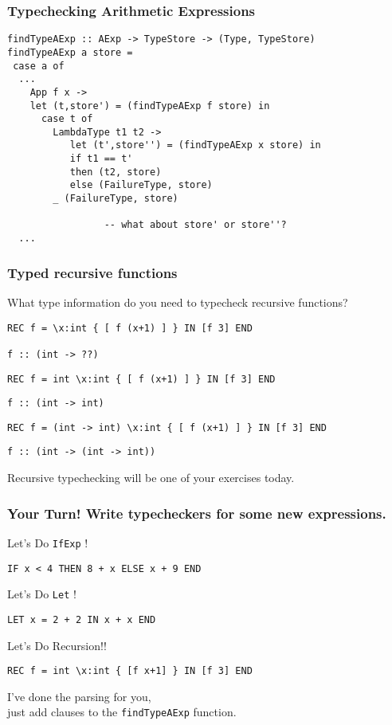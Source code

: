 \documentclass{beamer}
\begin{document}
\begin{frame}[fragile]
\frametitle{Typechecking Arithmetic Expressions}
\begin{verbatim}
findTypeAExp :: AExp -> TypeStore -> (Type, TypeStore)
findTypeAExp a store =
 case a of
  ...
    App f x -> 
    let (t,store') = (findTypeAExp f store) in
      case t of
        LambdaType t1 t2 -> 
           let (t',store'') = (findTypeAExp x store) in
           if t1 == t'
           then (t2, store)
           else (FailureType, store)
        _ (FailureType, store)
                 
                 -- what about store' or store''?
  ...
\end{verbatim}


\end{frame}
\begin{frame}[fragile]
\frametitle{Typed recursive functions}
What type information do you need to typecheck recursive functions?
\begin{verbatim}
REC f = \x:int { [ f (x+1) ] } IN [f 3] END

f :: (int -> ??)
\end{verbatim}

\pause
\begin{verbatim}
REC f = int \x:int { [ f (x+1) ] } IN [f 3] END
\end{verbatim}
\pause
\begin{verbatim}
f :: (int -> int)
\end{verbatim}
\pause
\begin{verbatim}
REC f = (int -> int) \x:int { [ f (x+1) ] } IN [f 3] END
\end{verbatim}
\pause
\begin{verbatim}
f :: (int -> (int -> int))
\end{verbatim}
\pause
Recursive typechecking will be one of your exercises today.
\end{frame}


\begin{frame}[fragile]
\frametitle{Your Turn! Write typecheckers for some new expressions.}

{\LARGE Let's Do {\tt IfExp} !}

\begin{verbatim}
IF x < 4 THEN 8 + x ELSE x + 9 END
\end{verbatim}

\bigskip
{\LARGE Let's Do {\tt Let} !}

\begin{verbatim}
LET x = 2 + 2 IN x + x END
\end{verbatim}

\bigskip
{\LARGE Let's Do Recursion!!}
\begin{verbatim}
REC f = int \x:int { [f x+1] } IN [f 3] END
\end{verbatim}

\bigskip


I've done the parsing for you, \\just add clauses  to the
{\tt findTypeAExp} function.

\end{frame}
\end{document}
